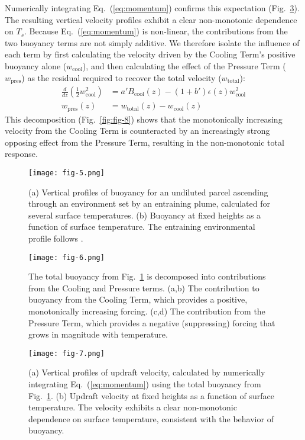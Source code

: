 \documentclass{ametsocV6.1}
\begin{document}
Numerically integrating Eq.~(\ref{eq:momentum}) confirms this expectation (Fig.~\ref{fig:fig-7}). The resulting vertical velocity profiles exhibit a clear non-monotonic dependence on $T_s$. Because Eq.~(\ref{eq:momentum}) is non-linear, the contributions from the two buoyancy terms are not simply additive. We therefore isolate the influence of each term by first calculating the velocity driven by the Cooling Term's positive buoyancy alone ($w_{\text{cool}}$), and then calculating the effect of the Pressure Term ($w_{\text{pres}}$) as the residual required to recover the total velocity ($w_{\text{total}}$):
\begin{align}
\frac{d}{dz}\left(\frac{1}{2}w_{\text{cool}}^2\right)&=a'B_{\text{cool}}(z)-(1+b')\epsilon(z)w_{\text{cool}}^2 \label{eq:w_cool} \\
w_{\text{pres}}(z)&=w_{\text{total}}(z)-w_{\text{cool}}(z) \label{eq:w_pres}
\end{align}
This decomposition (Fig.~\ref{fig:fig-8}) shows that the monotonically increasing velocity from the Cooling Term is counteracted by an increasingly strong opposing effect from the Pressure Term, resulting in the non-monotonic total response.

\begin{figure}[htbp]
 \centering
 \texttt{[image: fig-5.png]}\\
 \caption{(a) Vertical profiles of buoyancy for an undiluted parcel ascending through an environment set by an entraining plume, calculated for several surface temperatures. (b) Buoyancy at fixed heights as a function of surface temperature. The entraining environmental profile follows \cite{romps2016}.}\label{fig:fig-5}
\end{figure}

\begin{figure}[htbp]
 \centering
 \texttt{[image: fig-6.png]}\\
 \caption{The total buoyancy from Fig.~\ref{fig:fig-5} is decomposed into contributions from the Cooling and Pressure terms. (a,b) The contribution to buoyancy from the Cooling Term, which provides a positive, monotonically increasing forcing. (c,d) The contribution from the Pressure Term, which provides a negative (suppressing) forcing that grows in magnitude with temperature.}\label{fig:fig-6}
\end{figure}

\begin{figure}[htbp]
 \centering
 \texttt{[image: fig-7.png]}\\
 \caption{(a) Vertical profiles of updraft velocity, calculated by numerically integrating Eq.~(\ref{eq:momentum}) using the total buoyancy from Fig.~\ref{fig:fig-5}. (b) Updraft velocity at fixed heights as a function of surface temperature. The velocity exhibits a clear non-monotonic dependence on surface temperature, consistent with the behavior of buoyancy.}\label{fig:fig-7}
\end{figure}
\end{document}
